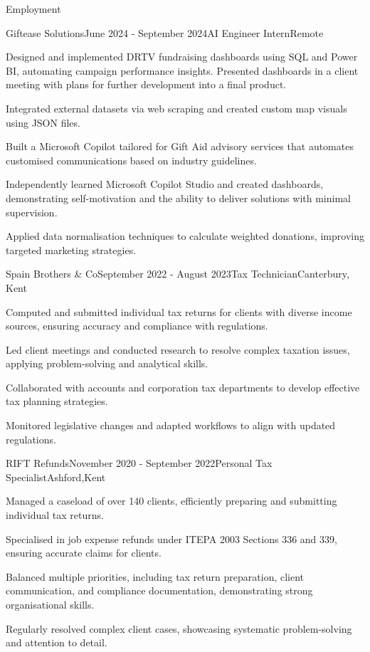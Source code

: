 \documentclass[
	11pt, %
]{resume} %
\begin{document}
\begin{rSection}{Employment}

	\begin{rSubsection}{Giftease Solutions}{June 2024 - September 2024}{AI Engineer Intern}{Remote}
		\item Designed and implemented DRTV fundraising dashboards using SQL and Power BI, automating campaign
		performance insights. Presented dashboards in a client meeting with plans for further development into
		a final product.
		\item Integrated external datasets via web scraping and created custom map visuals using JSON files.
        \item Built a Microsoft Copilot tailored for Gift Aid advisory services that automates customised
		communications based on industry guidelines.
        \item Independently learned Microsoft Copilot Studio and created dashboards, demonstrating self-motivation
		and the ability to deliver solutions with minimal supervision.
        \item Applied data normalisation techniques to calculate weighted donations, improving targeted
		marketing strategies.
	\end{rSubsection}


	\begin{rSubsection}{Spain Brothers \& Co}{September 2022 - August 2023}{Tax Technician}{Canterbury, Kent}
		\item Computed and submitted individual tax returns for clients with diverse income sources, ensuring
		accuracy and compliance with regulations.
		\item Led client meetings and conducted research to resolve complex taxation issues, applying problem-solving
		and analytical skills.
		\item Collaborated with accounts and corporation tax departments to develop effective tax planning strategies.
		\item Monitored legislative changes and adapted workflows to align with updated regulations.
	\end{rSubsection}


	\begin{rSubsection}{RIFT Refunds}{November 2020 - September 2022}{Personal Tax Specialist}{Ashford,Kent}
		\item Managed a caseload of over 140 clients, efficiently preparing and submitting individual tax returns.
		\item Specialised in job expense refunds under ITEPA 2003 Sections 336 and 339, ensuring accurate claims for
		clients.
		\item Balanced multiple priorities, including tax return preparation, client communication, and compliance
		documentation, demonstrating strong organisational skills.
        \item Regularly resolved complex client cases, showcasing systematic problem-solving and attention to detail.
	\end{rSubsection}


\end{rSection}
\end{document}
